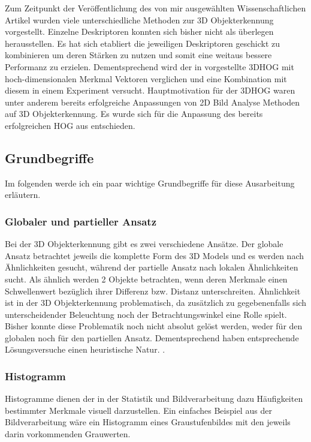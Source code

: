 Zum Zeitpunkt der Veröffentlichung des von mir ausgewählten Wissenschaftlichen Artikel wurden viele
unterschiedliche Methoden zur 3D Objekterkennung vorgestellt. Einzelne Deskriptoren konnten sich 
bisher nicht als überlegen herausstellen. Es hat sich etabliert die jeweiligen Deskriptoren
geschickt zu kombinieren um deren Stärken zu nutzen und somit eine weitaus bessere Performanz zu erzielen.
Dementsprechend wird der in \cite{scherer2010histograms} vorgestellte 3DHOG mit hoch-dimensionalen Merkmal Vektoren
verglichen und eine Kombination mit diesem in einem Experiment versucht.
\newline
Hauptmotivation für der 3DHOG waren unter anderem bereits erfolgreiche Anpassungen von 2D Bild Analyse Methoden auf 3D Objekterkennung. Es wurde sich für die Anpassung des bereits erfolgreichen HOG aus \cite{dalal2005histograms} entschieden.


\subsection{Grundbegriffe}
Im folgenden werde ich ein paar wichtige Grundbegriffe für diese Ausarbeitung erläutern. 

\subsubsection{Globaler und partieller Ansatz}
Bei der 3D Objekterkennung gibt es zwei verschiedene Ansätze. Der globale Ansatz betrachtet jeweils die komplette Form des
3D Models und es werden nach Ähnlichkeiten gesucht, während der partielle Ansatz nach lokalen Ähnlichkeiten sucht. Als ähnlich werden 2 Objekte betrachten, wenn deren Merkmale einen Schwellenwert bezüglich ihrer Differenz bzw. Distanz unterschreiten. Ähnlichkeit ist in der 3D Objekterkennung problematisch, da zusätzlich zu gegebenenfalls sich unterscheidender Beleuchtung noch der Betrachtungswinkel eine Rolle spielt. Bisher konnte diese Problematik noch nicht absolut gelöst werden, weder für den globalen noch für den partiellen Ansatz. Dementsprechend haben entsprechende Lösungsversuche einen heuristische Natur. \cite{scherer2010histograms}.

\subsubsection{Histogramm}
Histogramme dienen der in der Statistik und Bildverarbeitung dazu Häufigkeiten bestimmter Merkmale
visuell darzustellen. Ein einfaches Beispiel aus der Bildverarbeitung wäre ein Histogramm eines
Graustufenbildes mit den jeweils darin vorkommenden Grauwerten. 

